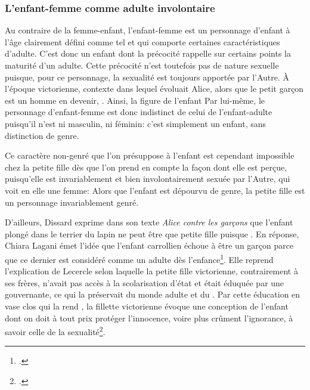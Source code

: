 \subsubsection{L'enfant-femme comme adulte involontaire}
Au contraire de la femme-enfant, l'enfant-femme est un personnage d'enfant à l'âge clairement défini comme tel et qui comporte certaines caractéristiques d'adulte.
C'est donc un enfant dont la précocité rappelle sur certains points la maturité d'un adulte.
Cette précocité n'est toutefois pas de nature sexuelle puisque, pour ce personnage, la sexualité est toujours apportée par l'Autre.
À l'époque victorienne, contexte dans lequel évoluait Alice, alors que le petit garçon est un homme en devenir, .
Ainsi, la figure de l'enfant 
Par lui-même, le personnage d'enfant-femme est donc indistinct de celui de l'enfant-adulte puisqu'il n'est ni masculin, ni féminin: c'est simplement un enfant, sans distinction de genre.
\par
Ce caractère non-genré que l'on présuppose à l'enfant est cependant impossible chez la petite fille dès que l'on prend en compte la façon dont elle est perçue, puisqu'elle est invariablement et bien involontairement sexuée par l'Autre, qui voit en elle une femme:
Alors que l'enfant est dépourvu de genre, la petite fille est un personnage invariablement genré.
\par
D'ailleurs, Dissard exprime dans son texte \textit{Alice contre les garçons} que l'enfant plongé dans le terrier du lapin ne peut être que petite fille puisque .
En réponse, Chiara Lagani émet l'idée que l'enfant carrollien échoue à être un garçon parce que ce dernier est considéré comme un adulte dès l'enfance\footcite[204]{Lagani2005}.
Elle reprend l'explication de Lecercle selon laquelle la petite fille victorienne, contrairement à ses frères, n'avait pas accès à la scolarisation d'état et était éduquée par une gouvernante, ce qui la préservait du monde adulte et du .
Par cette éducation en vase clos qui la rend , la fillette victorienne évoque une conception de l'enfant dont on doit à tout prix protéger l'innocence, voire plus crûment l'ignorance, à savoir celle de la sexualité\footcite[13-14]{Lecercle1998}.
